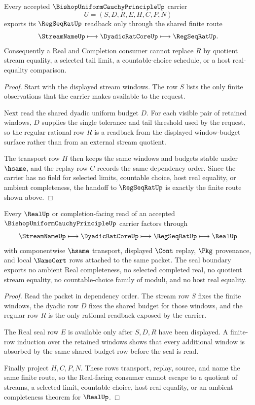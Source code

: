 \begin{theorem}
\label{thm:bishop-uniform-cauchy-principle-regseqrat-handoff}
Every accepted $\BishopUniformCauchyPrincipleUp$ carrier
$$
U=(S,D,R,E,H,C,P,N)
$$
exports its $\RegSeqRatUp$ readback only through the shared finite route
$$
\StreamNameUp \longmapsto \DyadicRatCoreUp \longmapsto \RegSeqRatUp .
$$
Consequently a Real and Completion consumer cannot replace $R$ by quotient stream equality, a selected tail limit, a countable-choice schedule, or a host real-equality comparison.
\end{theorem}
\begin{proof}
Start with the displayed stream windows. The row $S$ lists the only finite observations that the carrier makes available to the request.

Next read the shared dyadic uniform budget $D$. For each visible pair of retained windows, $D$ supplies the single tolerance and tail threshold used by the request, so the regular rational row $R$ is a readback from the displayed window-budget surface rather than from an external stream quotient.

The transport row $H$ then keeps the same windows and budgets stable under $\hsame$, and the replay row $C$ records the same dependency order. Since the carrier has no field for selected limits, countable choice, host real equality, or ambient completeness, the handoff to $\RegSeqRatUp$ is exactly the finite route shown above.
\end{proof}

\begin{theorem}
\label{thm:bishop-uniform-cauchy-principle-real-seal-boundary}
Every $\RealUp$ or completion-facing read of an accepted $\BishopUniformCauchyPrincipleUp$ carrier factors through
$$
\StreamNameUp \longmapsto \DyadicRatCoreUp \longmapsto \RegSeqRatUp \longmapsto \RealUp
$$
with componentwise $\hsame$ transport, displayed $\Cont$ replay, $\Pkg$ provenance, and local $\NameCert$ rows attached to the same packet. The seal boundary exports no ambient Real completeness, no selected completed real, no quotient stream equality, no countable-choice family of moduli, and no host real equality.
\end{theorem}
\begin{proof}
Read the packet in dependency order. The stream row $S$ fixes the finite windows, the dyadic row $D$ fixes the shared budget for those windows, and the regular row $R$ is the only rational readback exposed by the carrier.

The Real seal row $E$ is available only after $S,D,R$ have been displayed. A finite-row induction over the retained windows shows that every additional window is absorbed by the same shared budget row before the seal is read.

Finally project $H,C,P,N$. These rows transport, replay, source, and name the same finite route, so the Real-facing consumer cannot escape to a quotient of streams, a selected limit, countable choice, host real equality, or an ambient completeness theorem for $\RealUp$.
\end{proof}

